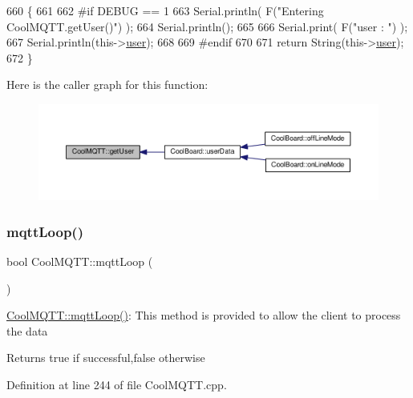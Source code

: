 \begin{DoxyCode}
660 \{
661 
662 \textcolor{preprocessor}{#if DEBUG == 1 }
663     Serial.println( F(\textcolor{stringliteral}{"Entering CoolMQTT.getUser()"}) );
664     Serial.println();
665     
666     Serial.print( F(\textcolor{stringliteral}{"user : "}) );
667     Serial.println(this->\hyperlink{classCoolMQTT_a8cd47e45d457f908d4b4390b35aaee83}{user});
668 
669 \textcolor{preprocessor}{#endif}
670 
671     \textcolor{keywordflow}{return} String(this->\hyperlink{classCoolMQTT_a8cd47e45d457f908d4b4390b35aaee83}{user});
672 \}
\end{DoxyCode}
Here is the caller graph for this function\+:
\nopagebreak
\begin{figure}[H]
\begin{center}
\leavevmode
\includegraphics[width=350pt]{classCoolMQTT_a373cc92fca7760d886f02d8a6e5b3f63_icgraph}
\end{center}
\end{figure}
\mbox{\label{classCoolMQTT_aa5eaae967b562b62cbcf2b8d81f6e5d5}} 
\subsubsection{\texorpdfstring{mqtt\+Loop()}{mqttLoop()}}
{\footnotesize\ttfamily bool Cool\+M\+Q\+T\+T\+::mqtt\+Loop (\begin{DoxyParamCaption}{ }\end{DoxyParamCaption})}

\hyperlink{classCoolMQTT_aa5eaae967b562b62cbcf2b8d81f6e5d5}{Cool\+M\+Q\+T\+T\+::mqtt\+Loop()}\+: This method is provided to allow the client to process the data

\begin{DoxyReturn}{Returns}
true if successful,false otherwise 
\end{DoxyReturn}


Definition at line 244 of file Cool\+M\+Q\+T\+T.\+cpp.



